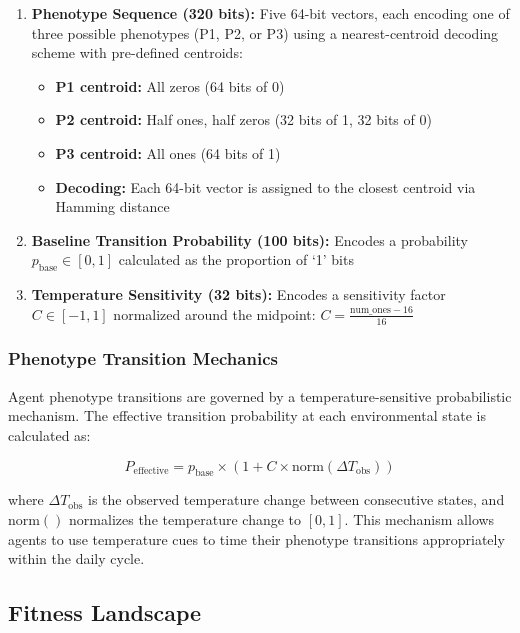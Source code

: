\documentclass[aps,pre,twocolumn,floatfix,nofootinbib,amsmath,amssymb]{revtex4-2}
\begin{document}
\begin{enumerate}
\item \textbf{Phenotype Sequence (320 bits):} Five 64-bit vectors, each encoding one of three possible phenotypes (P1, P2, or P3) using a nearest-centroid decoding scheme with pre-defined centroids:
    \begin{itemize}
    \item \textbf{P1 centroid:} All zeros (64 bits of 0)
    \item \textbf{P2 centroid:} Half ones, half zeros (32 bits of 1, 32 bits of 0)
    \item \textbf{P3 centroid:} All ones (64 bits of 1)
    \item \textbf{Decoding:} Each 64-bit vector is assigned to the closest centroid via Hamming distance
    \end{itemize}
\item \textbf{Baseline Transition Probability (100 bits):} Encodes a probability $p_{\text{base}} \in [0,1]$ calculated as the proportion of `1' bits
\item \textbf{Temperature Sensitivity (32 bits):} Encodes a sensitivity factor $C \in [-1,1]$ normalized around the midpoint: $C = \frac{\text{num\_ones} - 16}{16}$
\end{enumerate}

\subsubsection{Phenotype Transition Mechanics}

Agent phenotype transitions are governed by a temperature-sensitive probabilistic mechanism. The effective transition probability at each environmental state is calculated as:

\begin{equation}
P_{\text{effective}} = p_{\text{base}} \times (1 + C \times \text{norm}(\Delta T_{\text{obs}}))
\end{equation}

where $\Delta T_{\text{obs}}$ is the observed temperature change between consecutive states, and $\text{norm}()$ normalizes the temperature change to $[0,1]$. This mechanism allows agents to use temperature cues to time their phenotype transitions appropriately within the daily cycle.

\subsection{Fitness Landscape}
\end{document}
